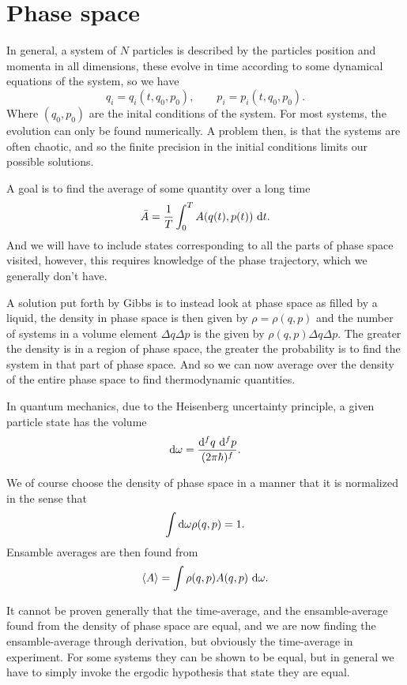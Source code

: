 \documentclass[a4paper, 11pt, notitlepage, english]{article}
\renewcommand{\d}{{\rm d}}
\begin{document}
\clearpage

\section*{Phase space}

In general, a system of $N$ particles is described by the particles position and momenta in all dimensions, these evolve in time according to some dynamical equations of the system, so we have
$$q_i = q_i(t, q_0, p_0), \qquad p_i = p_i(t,q_0,p_0).$$
Where $(q_0, p_0)$ are the inital conditions of the system. For most systems, the evolution can only be found numerically. A problem then, is that the systems are often chaotic, and so the finite precision in the initial conditions limits our possible solutions.

A goal is to find the average of some quantity over a long time
$$\bar{A} = \frac{1}{T}\int_0^T A(q(t), p(t)) \ \d t.$$
And we will have to include states corresponding to all the parts of phase space visited, however, this requires knowledge of the phase trajectory, which we generally don't have.

A solution put forth by Gibbs is to instead look at phase space as filled by a liquid, the density in phase space is then given by $\rho = \rho(q,p)$ and the number of systems in a volume element $\Delta q \Delta p$ is the given by $\rho(q,p)\Delta q \Delta p$. The greater the density is in a region of phase space, the greater the probability is to find the system in that part of phase space. And so we can now average over the density of the entire phase space to find thermodynamic quantities.

In quantum mechanics, due to the Heisenberg uncertainty principle, a given particle state has the volume
$$\d\omega = \frac{\d^f q\  \d^f p}{(2\pi \hbar)^f}.$$

We of course choose the density of phase space in a manner that it is normalized in the sense that
$$\int \d \omega \rho(q,p) = 1.$$
Ensamble averages are then found from
$$\langle A \rangle = \int \rho(q,p) A(q,p) \ \d \omega.$$

It cannot be proven generally that the time-average, and the ensamble-average found from the density of phase space are equal, and we are now finding the ensamble-average through derivation, but obviously the time-average in experiment. For some systems they can be shown to be equal, but in general we have to simply invoke the ergodic hypothesis that state they are equal.
\end{document}
